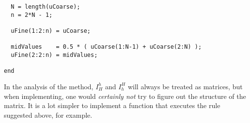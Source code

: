 \begin{example}[Multigrid]
\begin{lstlisting}
  N = length(uCoarse);
  n = 2*N - 1;

  uFine(1:2:n) = uCoarse;

  midValues    = 0.5 * ( uCoarse(1:N-1) + uCoarse(2:N) );
  uFine(2:2:n) = midValues;

end
\end{lstlisting}


In the analysis of the method, $I_H^h$ and $I_h^H$ will always be treated as
matrices, but when implementing, one would \emph{certainly not} try to figure
out the structure of the matrix. It is a lot simpler to implement a function
that executes the rule suggested above, for example.
\end{example}
